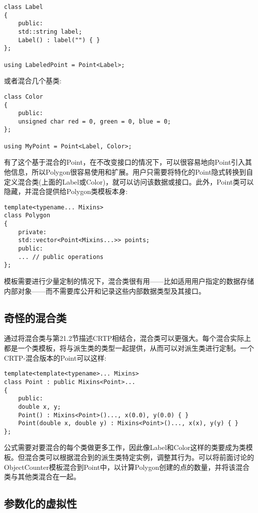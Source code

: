 \begin{lstlisting}[style=styleCXX]
class Label
{
	public:
	std::string label;
	Label() : label("") { }
};

using LabeledPoint = Point<Label>;
\end{lstlisting}

或者混合几个基类:

\begin{lstlisting}[style=styleCXX]
class Color
{
	public:
	unsigned char red = 0, green = 0, blue = 0;
};

using MyPoint = Point<Label, Color>;
\end{lstlisting}

有了这个基于混合的Point，在不改变接口的情况下，可以很容易地向Point引入其他信息，所以Polygon很容易使用和扩展。用户只需要将特化的Point隐式转换到自定义混合类(上面的Label或Color)，就可以访问该数据或接口。此外，Point类可以隐藏，并混合提供给Polygon类模板本身:

\begin{lstlisting}[style=styleCXX]
template<typename... Mixins>
class Polygon
{
	private:
	std::vector<Point<Mixins...>> points;
	public:
	... // public operations
};
\end{lstlisting}

模板需要进行少量定制的情况下，混合类很有用——比如适用用户指定的数据存储内部对象——而不需要库公开和记录这些内部数据类型及其接口。

\subsection{奇怪的混合类}

通过将混合类与第21.2节描述CRTP相结合，混合类可以更强大。每个混合实际上都是一个类模板，将与派生类的类型一起提供，从而可以对派生类进行定制。一个CRTP-混合版本的Point可以这样:

\begin{lstlisting}[style=styleCXX]
template<template<typename>... Mixins>
class Point : public Mixins<Point>...
{
	public:
	double x, y;
	Point() : Mixins<Point>()..., x(0.0), y(0.0) { }
	Point(double x, double y) : Mixins<Point>()..., x(x), y(y) { }
};
\end{lstlisting}

公式需要对要混合的每个类做更多工作，因此像Label和Color这样的类要成为类模板。但混合类可以根据混合到的派生类特定实例，调整其行为。可以将前面讨论的ObjectCounter模板混合到Point中，以计算Polygon创建的点的数量，并将该混合类与其他类混合在一起。

\subsection{参数化的虚拟性}

